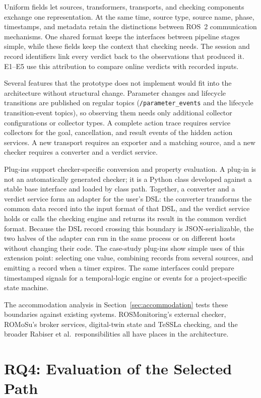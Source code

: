 Uniform fields let sources,
transformers, transports, and checking components exchange one
representation. At the same time, source type, source name, phase, timestamps,
and metadata retain the distinctions between ROS~2 communication mechanisms.
One shared format keeps the interfaces between pipeline stages simple, while
these fields keep the context that checking needs. The session and record
identifiers link every verdict back to the observations that produced it.
E1--E5 use this attribution to compare online verdicts with
recorded inputs.

Several features that the prototype does not implement would fit into the
architecture without structural change. Parameter changes and lifecycle
transitions are published on regular topics (\texttt{/parameter\_events} and
the lifecycle transition-event topics), so observing them needs only
additional collector configurations or collector types. A complete action
trace requires service collectors for the goal, cancellation, and result
events of the hidden action services. A new transport requires an exporter
and a matching source, and a new checker requires a converter and a verdict
service.

Plug-ins support checker-specific conversion and property evaluation. A
plug-in is not an automatically generated checker; it is a Python class
developed against a stable base interface and loaded by class path. Together, a converter and a
verdict service form an adapter for the user's DSL: the converter transforms
the common data record into the input format of that DSL, and the verdict
service holds or calls the checking engine and returns its result in the
common verdict format. Because the DSL record crossing this boundary is
JSON-serializable, the two halves of the adapter can run in the same process
or on different hosts without changing their code. The case-study plug-ins
show simple uses of this extension point: selecting one value, combining
records from several sources, and emitting a record when a timer expires.
The same interfaces could prepare timestamped signals for a
temporal-logic engine or events for a project-specific state machine.

The accommodation analysis in Section~\ref{sec:accommodation} tests these
boundaries against existing systems. ROSMonitoring's external checker, ROMoSu's broker
services, digital-twin state and TeSSLa checking, and the broader Rabiser et al.\
responsibilities all have places in the architecture.

\section{RQ4: Evaluation of the Selected Path}

